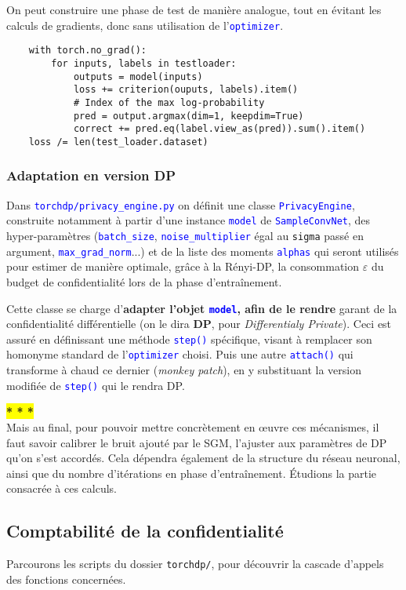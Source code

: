 \documentclass[a4paper,11pt]{article} %
\newcommand{\ttt}[1]{\texttt{#1}}
\newcommand{\code}[1]{\textcolor{blue}{\texttt{#1}}}
\newcommand{\rem}[1]{\colorbox{yellow}{\textbf{#1}}}
\begin{document}
On peut construire une phase de test de manière analogue, tout en évitant les calculs de gradients, donc sans utilisation de l'\code{optimizer}.
    \begin{verbatim}
    with torch.no_grad():
        for inputs, labels in testloader:
            outputs = model(inputs)
            loss += criterion(ouputs, labels).item()
            # Index of the max log-probability
            pred = output.argmax(dim=1, keepdim=True)
            correct += pred.eq(label.view_as(pred)).sum().item()
    loss /= len(test_loader.dataset)
    \end{verbatim}
%
\subsubsection{Adaptation en version DP}
Dans \code{torchdp/privacy\_engine.py} on définit une classe \code{PrivacyEngine}, construite notamment à partir d'une instance \code{model} de \code{SampleConvNet}, des hyper-paramètres (\code{batch\_size}, \code{noise\_multiplier} égal au \ttt{sigma} passé en argument, \code{max\_grad\_norm}...) et de la liste des moments \code{alphas} qui seront utilisés pour estimer de manière optimale, grâce à la Rényi-DP, la consommation $\varepsilon$ du budget de confidentialité lors de la phase d'entraînement.

Cette classe se charge d'\textbf{adapter l'objet \code{model}, afin de le rendre} garant de la confidentialité différentielle (on le dira \textbf{DP}, pour \emph{Differentialy Private}). Ceci est assuré en définissant une méthode \code{step()} spécifique, visant à remplacer son homonyme standard de l'\code{optimizer} choisi. Puis une autre \code{attach()} qui transforme à chaud ce dernier (\og \emph{monkey patch}\fg{}), en y substituant la version modifiée de \code{step()} qui le rendra DP.


\rem{* * *}\\
Mais au final, pour pouvoir mettre concrètement en œuvre ces mécanismes, il faut savoir calibrer le bruit ajouté par le SGM, l'ajuster aux paramètres de DP qu'on s'est accordés. Cela dépendra également de la structure du réseau neuronal, ainsi que du nombre d'itérations en phase d'entraînement. Étudions la partie consacrée à ces calculs.
%
\subsection{Comptabilité de la confidentialité}%
%
Parcourons les scripts du dossier \ttt{torchdp/}, pour découvrir la cascade d'appels des fonctions concernées.
\end{document}
